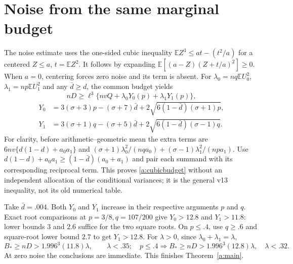 \documentclass[11pt]{article}
\newcommand{\E}{\mathbb E}\newcommand{\Pp}{\mathbb P}
\begin{document}
\section{Noise from the same marginal budget}
The noise estimate uses the one-sided cubic inequality
$\E Z^3\le at-(t^2/a)$ for a centered $Z\le a$, $t=\E Z^2$.
It follows by expanding $\E[(a-Z)(Z+t/a)^2]\ge0$.
When $a=0$, centering forces zero noise and its term is absent.
For $\lambda_0=nq\E U_0^2$, $\lambda_1=np\E U_1^2$ and any
$\bar d\ge d$, the common budget yields
\begin{equation}\label{a:cubicbudget}
 nD\ge\ell^3\{nvQ+\lambda_0Y_0(p)+\lambda_1Y_1(p)\},
\end{equation}
\begin{align*}
 Y_0&=3(\sigma+3)p-(\sigma+7)\bar d
               +2\sqrt{6(1-\bar d)(\sigma+1)p},\\
 Y_1&=3(\sigma+1)q-(\sigma+5)\bar d
               +2\sqrt{6(1-\bar d)(\sigma-1)q}.
\end{align*}
For clarity, before arithmetic--geometric mean the extra terms are
$6nv\{d(1-d)+a_0a_1\}$ and
$(\sigma+1)\lambda_0^2/(nqa_0)+(\sigma-1)\lambda_1^2/(npa_1)$.
Use $d(1-d)+a_0a_1\ge(1-\bar d)(a_0+a_1)$ and pair each summand
with its corresponding reciprocal term. This proves
\eqref{a:cubicbudget} without an independent allocation of the conditional
variances; it is the general v13 inequality, not its old numerical table.

Take $\bar d=.004$. Both $Y_0$ and $Y_1$ increase in their respective
arguments $p$ and $q$. Exact root comparisons at $p=3/8,q=107/200$ give
$Y_0>12.8$ and $Y_1>11.8$: lower bounds $3$ and $2.6$ suffice for the two
square roots. On $p\le.4$, use $q\ge.6$ and square-root lower bound
$2.7$ to get $Y_1>12.8$. For $\lambda>0$, since $\lambda_0+\lambda_1=\lambda$,
\[
 B_*\ge nD>1.996^3(11.8)\lambda,
 \qquad \lambda<.35;
 \quad p\le.4\Longrightarrow B_*\ge nD>1.996^3(12.8)\lambda,
 \quad \lambda<.32.
\]
At zero noise the conclusions are immediate. This finishes
Theorem~\ref{a:main}.
\end{document}

